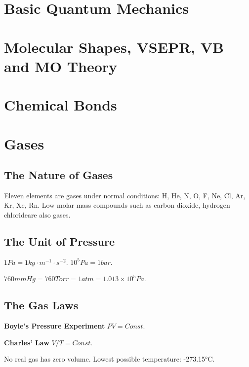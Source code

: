 \documentclass[a4paper,12pt]{article}
\begin{document}
\newpage
\section{Basic Quantum Mechanics}

\newpage
\section{Molecular Shapes, VSEPR, VB and MO Theory}

\newpage
\section{Chemical Bonds}

\newpage
\section{Gases}
\subsection{The Nature of Gases} Eleven elements are gases under normal conditions: H, He, N, O, F, Ne, Cl, Ar, Kr, Xe, Rn. Low molar mass compounds such as carbon dioxide, hydrogen chlorideare also gases.
\subsection{The Unit of Pressure}
$1 Pa=1 kg\cdot m^{-1}\cdot s^{-2}$. $10^{5} Pa=1 bar$.\par $760 mmHg=760 Torr=1atm=1.013\times 10^{5} Pa$.
\subsection{The Gas Laws}
\textbf{Boyle's Pressure Experiment} $PV=Const.$\par
\textbf{Charles' Law} $V/T=Const.$\par No real gas has zero volume. Lowest possible temperature: -273.15°C.
\end{document}
